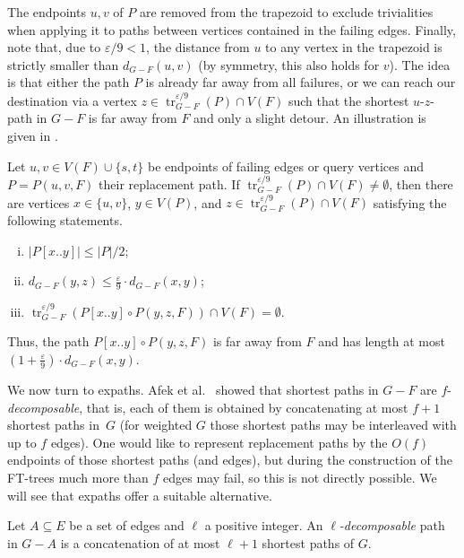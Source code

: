 \documentclass{theoretics}
\DeclareMathOperator{\tr}{tr}
\newcommand*{\length}[1]{|#1|}
\renewcommand{\le}{\leqslant}
\newcommand{\eps}{\varepsilon}
\begin{document}
The endpoints $u,v$ of $P$ are removed from the trapezoid
to exclude trivialities when applying it to paths
between vertices contained in the failing edges.
Finally, note that, due to $\eps/9 < 1$, 
the distance from $u$ to any vertex in the trapezoid is strictly smaller than $d_{G-F}(u,v)$
(by symmetry, this also holds for $v$).
The idea is that either the path $P$
is already far away from all failures, 
or we can reach our destination via a vertex $z \in \tr^{\eps/9}_{G-F}(P) \cap V(F)$
such that the shortest $u$-$z$-path in $G-F$ is far away from $F$
and only a slight detour.
An illustration is given in .

\begin{lemma}
\label{lem:not_too_far_off}
  Let $u,v \in V(F) \cup \{s,t\}$ be endpoints of failing edges or query vertices
  and $P = P(u,v,F)$ their replacement path.
  If $\tr^{\eps/9}_{G-F}(P) \cap V(F) \neq \emptyset$,
  then there are vertices $x \in \{u,v\}$, $y \in V(P)$,
  and $z \in \tr^{\eps/9}_{G-F}(P) \cap V(F)$ satisfying the following statements.
  \begin{enumerate}[(i)]
    \item $\length{P[x..y]} \le \length{P}/2$;
    \item $d_{G-F}(y,z) \le \frac{\eps}{9} \cdot d_{G-F}(x,y)$;
    \item $\tr^{\eps/9}_{G-F}(P[x..y] \circ P(y,z,F)) \cap V(F) = \emptyset$.
  \end{enumerate}
  Thus, the path $P[x..y] \circ P(y,z,F)$ is far away from $F$
  and has length at most $(1+ \tfrac{\eps}{9}) \cdot d_{G-F}(x,y)$.
\end{lemma}

We now turn to expaths.
Afek et al.~\cite{Afek02RestorationbyPathConcatenation_journal} 
showed that shortest paths in $G-F$ are $f$-\emph{decomposable},
that is, each of them is obtained by concatenating at most $f+1$ shortest paths in~$G$ 
(for weighted $G$ those shortest paths may be interleaved with up to $f$ edges).
One would like to represent replacement paths by the $O(f)$ endpoints of those shortest paths (and edges),
but during the construction of the FT-trees much more than $f$ edges may fail,
so this is not directly possible.
We will see that expaths offer a suitable alternative.

\begin{definition}
\label{definition:h-decomposable}
Let $A \subseteq E$ be a set of edges and $\ell$ a positive integer. 
An $\ell$\emph{-decomposable} path in $G - A$ is
a concatenation of at most $\ell+1$ shortest paths of $G$.
\end{definition}
\end{document}
